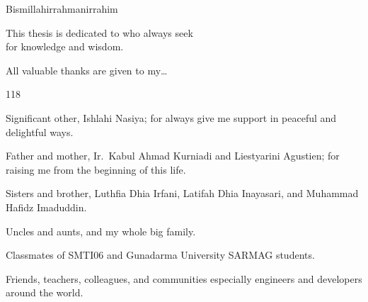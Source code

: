 
\clearpage
\vspace*{\fill}
\begin{minipage}{.8\textwidth}
\begin{center}


\noindent Bismillahirrahmanirrahim

\hfill

\noindent This thesis is dedicated to who always seek\\for knowledge and wisdom.

\hfill

\noindent All valuable thanks are given to my\ldots

\begin{dinglist}{118}
\item Significant other, Ishlahi Nasiya; for always give me support in peaceful and delightful ways.
\item Father and mother, Ir.\ Kabul Ahmad Kurniadi and Liestyarini Agustien; for raising me from the beginning of this life.
\item Sisters and brother, Luthfia Dhia Irfani, Latifah Dhia Inayasari, and Muhammad Hafidz Imaduddin.
\item Uncles and aunts, and my whole big family.
\item Classmates of SMTI06 and Gunadarma University SARMAG students.
\item Friends, teachers, colleagues, and communities especially engineers and developers around the world.
\end{dinglist}

\end{center}
\end{minipage}
\vfill %
\clearpage

